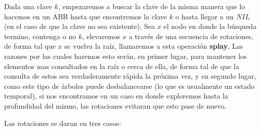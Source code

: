 \documentclass[10pt, a4paper]{report}
\begin{document}
Dada una clave $k$, empezaremos a buscar la clave de la misma manera que lo hacemos en un ABB hasta que encontremos la clave $k$ o hasta llegar a un $NIL$ (en el caso de que la clave no sea existente). Sea $x$ el nodo en donde la b\'usqueda termino, contenga o no $k$, elevaremos $x$ a trav\'es de una secuencia de rotaciones, de forma tal que $x$ se vuelva la ra\'iz, llamaremos a esta operaci\'on \textbf{splay}. Las razones por las cuales haremos esto ser\'an, en primer lugar, para mantener los elementos mas consultados en la ra\'iz o cerca de ella, de forma tal de que la consulta de estos sea verdaderamente r\'apida la pr\'oxima vez, y en segundo lugar, como este tipo de \'arboles puede desbalancearse (lo que es usualmente un estado temporal), si nos encontramos en un caso en donde exploremos hasta la profundidad del mismo, las rotaciones evitaran que esto pase de nuevo.

\newpage

Las rotaciones se daran en tres casos:
\end{document}

